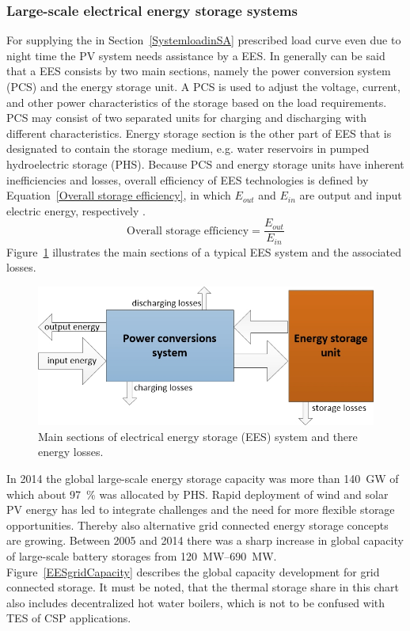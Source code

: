 \subsubsection{Large-scale electrical energy storage systems}
For supplying the in Section~\ref{SystemloadinSA} prescribed load curve even due to night time the PV system needs assistance by a EES. In generally can be said that a EES consists by two main sections, namely the power conversion system (PCS) and the energy storage unit. A PCS is used to adjust the voltage, current, and other power characteristics of the storage based on the load requirements. PCS may consist of two separated units for charging and discharging with different characteristics. Energy storage section is the other part of EES that is designated to contain the storage medium, e.g. water reservoirs in pumped hydroelectric storage (PHS). Because PCS and energy storage units have inherent inefficiencies and losses, overall efficiency of EES technologies is defined by Equation~\ref{Overall storage efficiency}, in which $E_{out}$ and $E_{in}$ are output and input electric energy, respectively \cite{Kaldellis2009}.
\begin{equation}
\textrm{Overall storage efficiency}=\frac{E_{out}}{E_{in}} \label{Overall storage efficiency}
\end{equation}
Figure~\ref{TCC_EES} illustrates the main sections of a typical EES system and the associated losses.

\begin{figure}[htbp]  
\centering
\includegraphics[width=0.65\linewidth]{FIG/EESSchema}
\caption[Main sections of electrical energy storage system and there energy losses.]{Main sections of electrical energy storage (EES) system and there energy losses.}\label{TCC_EES}
\end{figure}
In 2014 the global large-scale energy storage capacity was more than \SI{140}{\giga\watt} of which about \SI{97}{\percent} was allocated by PHS. Rapid deployment of wind and solar PV energy has led to integrate challenges and the need for more flexible storage opportunities. Thereby also alternative grid connected energy storage concepts are growing. Between 2005 and 2014 there was a sharp increase in global capacity of large-scale battery storages from \SIrange{120}{690}{\mega\watt}. Figure~\ref{EESgridCapacity} describes the global capacity development for grid connected storage. It must be noted, that the thermal storage share in this chart also includes decentralized hot water boilers, which is not to be confused with TES of CSP applications.

